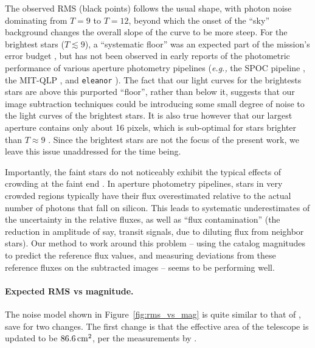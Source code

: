 \documentclass[12pt,twocolumn,tighten]{aastex62}
\begin{document}
The observed RMS (black points) follows the usual shape,
with photon noise dominating from $T=9$ to $T=12$, beyond which the
onset of the ``sky'' background changes the overall slope of the
curve to be more steep.
For the brightest stars ($T\lesssim 9$), a ``systematic floor'' was an
expected part of the mission's error budget \citep{ricker_transiting_2015}, 
but 
has not been observed in early
reports of the photometric performance of various aperture photometry
pipelines ({\it e.g.,} the SPOC pipeline \citealt{jenkins_spoc_2010},
the MIT-QLP \citealt{huang_tess_2018}, and \texttt{eleanor}
\citealt{feinstein_eleanor_2019}).
The fact that our light curves for the brightests stars are above this
purported ``floor'', rather than below it, suggests that our
image subtraction techniques could be introducing some small degree of
noise to the light curves of the brightest stars.
It is also true however that our largest aperture contains only about
16 pixels, which is sub-optimal for stars brighter than $T\approx9$
\citep[see][Figure~14]{Sullivan_et_al_2015}.
Since the brightest stars are not the focus of the present work, we
leave this issue unaddressed for the time being.

Importantly, the faint stars do not noticeably exhibit
the typical effects of crowding at the faint end 
\citep[{\it e.g.},][Figure~5]{feinstein_eleanor_2019}.
In aperture photometry pipelines, stars in very crowded regions typically 
have their flux overestimated relative to the actual number of photons
that fall on silicon.
This leads to systematic underestimates of the uncertainty in the relative 
fluxes, as well as ``flux contamination'' (the reduction in amplitude of say, 
transit signals, due to diluting flux from neighbor stars).
Our method to work around this problem -- using the catalog magnitudes to 
predict the reference flux values, and measuring deviations from these 
reference fluxes on the subtracted images -- seems to be performing well.


\paragraph{Expected RMS vs magnitude.}

The noise model shown in Figure~\ref{fig:rms_vs_mag} is quite similar
to that of \citet{Sullivan_et_al_2015}, save for two changes.
The first change is that the effective area of the telescope is
updated to be $86.6\,{\rm cm}^2$, per the measurements by
\citet{vanderspek_2018}.
\end{document}
